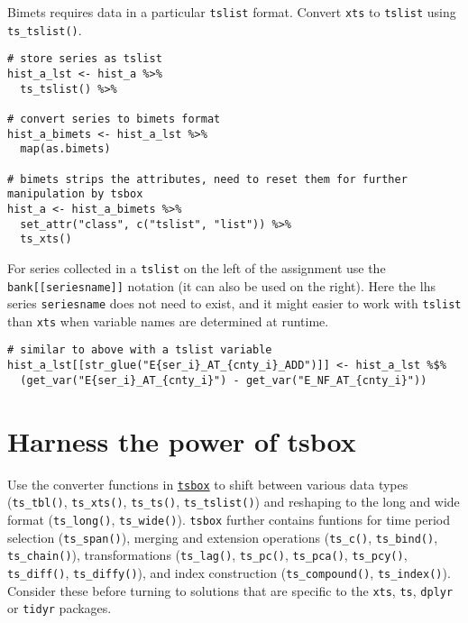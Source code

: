 \documentclass[
  letterpaper,
  DIV=11,
  numbers=noendperiod]{scrreport}
\begin{document}
Bimets requires data in a particular \texttt{tslist} format. Convert
\texttt{xts} to \texttt{tslist} using \texttt{ts\_tslist()}.

\begin{verbatim}
# store series as tslist
hist_a_lst <- hist_a %>% 
  ts_tslist() %>% 

# convert series to bimets format
hist_a_bimets <- hist_a_lst %>%
  map(as.bimets)

# bimets strips the attributes, need to reset them for further manipulation by tsbox
hist_a <- hist_a_bimets %>% 
  set_attr("class", c("tslist", "list")) %>% 
  ts_xts()
\end{verbatim}

For series collected in a \texttt{tslist} on the left of the assignment
use the \texttt{bank{[}{[}seriesname{]}{]}} notation (it can also be
used on the right). Here the lhs series \texttt{seriesname} does not
need to exist, and it might easier to work with \texttt{tslist} than
\texttt{xts} when variable names are determined at runtime.

\begin{verbatim}
# similar to above with a tslist variable
hist_a_lst[[str_glue("E{ser_i}_AT_{cnty_i}_ADD")]] <- hist_a_lst %$%
  (get_var("E{ser_i}_AT_{cnty_i}") - get_var("E_NF_AT_{cnty_i}"))
\end{verbatim}

\hypertarget{harness-the-power-of-tsbox}{%
\section{Harness the power of tsbox}\label{harness-the-power-of-tsbox}}

Use the converter functions in
\href{https://www.tsbox.help/reference/index.html}{\texttt{tsbox}} to
shift between various data types (\texttt{ts\_tbl()},
\texttt{ts\_xts()}, \texttt{ts\_ts()}, \texttt{ts\_tslist()}) and
reshaping to the long and wide format (\texttt{ts\_long()},
\texttt{ts\_wide()}). \texttt{tsbox} further contains funtions for time
period selection (\texttt{ts\_span()}), merging and extension operations
(\texttt{ts\_c()}, \texttt{ts\_bind()}, \texttt{ts\_chain()}),
transformations (\texttt{ts\_lag()}, \texttt{ts\_pc()},
\texttt{ts\_pca()}, \texttt{ts\_pcy()}, \texttt{ts\_diff()},
\texttt{ts\_diffy()}), and index construction (\texttt{ts\_compound()},
\texttt{ts\_index()}). Consider these before turning to solutions that
are specific to the \texttt{xts}, \texttt{ts}, \texttt{dplyr} or
\texttt{tidyr} packages.
\end{document}
